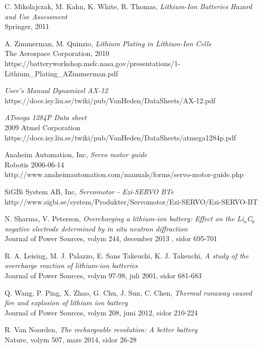 \documentclass[a4paper,12pt]{article}
\begin{document}
\begin{thebibliography}{9}
 C. Mikolajczak, M. Kahn, K. White, R. Thomas, \emph{Lithium-Ion Batteries Hazard and Use Assessment}
\\Springer, 2011

 A. Zimmerman, M. Quinzio, \emph{Lithium Plating in Lithium-Ion Cells}
\\The Aerospace Corporation, 2010
\\https://batteryworkshop.msfc.nasa.gov/presentations/1-Lithium\_Plating\_AZimmerman.pdf 

 \emph{User's Manual Dynamixel AX-12}
 \\ https://docs.isy.liu.se/twiki/pub/VanHeden/DataSheets/AX-12.pdf

 \emph{ATmega 1284P Data sheet}
\\2009 Atmel Corporation
\\https://docs.isy.liu.se/twiki/pub/VanHeden/DataSheets/atmega1284p.pdf

 Anaheim Automation, Inc, \emph{Servo motor guide}
\\Robotis 2006-06-14 
\\ http://www.anaheimautomation.com/manuals/forms/servo-motor-guide.php

 SiGBi System AB, Inc, \emph{Servomotor - Ezi-SERVO BTe}\\
http://www.sigbi.se/system/Produkter/Servomotor/Ezi-SERVO/Ezi-SERVO-BT

 N. Sharma, V. Peterson, \emph{Overcharging a lithium-ion battery: Effect on the Li$_{x}$C$_{6}$ negative electrode determined by in situ neutron diffraction}
\\ Journal of Power Sources, volym 244, december 2013 , sidor 695-701

 R. A. Leising, M. J. Palazzo, E. Sans Takeuchi, K. J. Takeuchi, \emph{A study of the overcharge reaction of lithium-ion batteries}
\\ Journal of Power Sources, volym 97-98, juli 2001, sidor 681-683

 Q. Wang, P. Ping, X. Zhao, G. Chu, J. Sun, C. Chen, \emph{Thermal runaway caused fire and explosion of lithium ion battery}
\\ Journal of Power Sources, volym 208, juni 2012, sidor 210-224

 R. Van Noorden, \emph{The rechargeable revolution: A better battery} \\ Nature, volym 507, mars 2014, sidor 26-28


\end{thebibliography}
\end{document}
